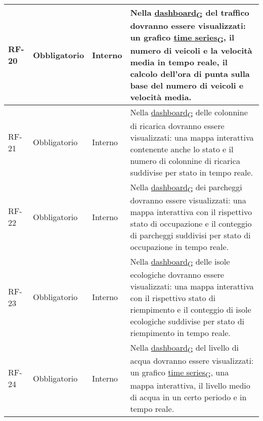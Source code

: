 \begin{longtable}{|>{\centering\arraybackslash}m{}|>{\centering\arraybackslash}m{}|>{\centering\arraybackslash}m{}|>{\centering\arraybackslash}m{}|}
	\\\hline
	RF-20           & Obbligatorio        & Interno                                                                                                           & Nella \href{https://7last.github.io/docs/rtb/documentazione-interna/glossario\#dashboard}{dashboard\textsubscript{G}} del traffico dovranno essere visualizzati: un grafico \href{https://7last.github.io/docs/rtb/documentazione-interna/glossario\#time-series}{time series\textsubscript{G}}, il numero di veicoli e la velocità media in tempo reale, il calcolo dell'ora di punta sulla base del numero di veicoli e velocità media.
	\\\hline
	RF-21           & Obbligatorio        & Interno                                                                                                           & Nella \href{https://7last.github.io/docs/rtb/documentazione-interna/glossario\#dashboard}{dashboard\textsubscript{G}} delle colonnine di ricarica dovranno essere visualizzati: una mappa interattiva contenente anche lo stato e il numero di colonnine di ricarica suddivise per stato in tempo reale.
	\\\hline
	RF-22           & Obbligatorio        & Interno                                                                                                           & Nella \href{https://7last.github.io/docs/rtb/documentazione-interna/glossario\#dashboard}{dashboard\textsubscript{G}} dei parcheggi dovranno essere visualizzati: una mappa interattiva con il rispettivo stato di occupazione e il conteggio di parcheggi suddivisi per stato di occupazione in tempo reale.
	\\\hline
	RF-23           & Obbligatorio        & Interno                                                                                                           & Nella \href{https://7last.github.io/docs/rtb/documentazione-interna/glossario\#dashboard}{dashboard\textsubscript{G}} delle isole ecologiche dovranno essere visualizzati: una mappa interattiva con il rispettivo stato di riempimento e il conteggio di isole ecologiche suddivise per stato di riempimento in tempo reale.
	\\\hline
	RF-24           & Obbligatorio        & Interno                                                                                                           & Nella \href{https://7last.github.io/docs/rtb/documentazione-interna/glossario\#dashboard}{dashboard\textsubscript{G}} del livello di acqua dovranno essere visualizzati: un grafico \href{https://7last.github.io/docs/rtb/documentazione-interna/glossario\#time-series}{time series\textsubscript{G}}, una mappa interattiva, il livello medio di acqua in un certo periodo e in tempo reale.

\end{longtable}
